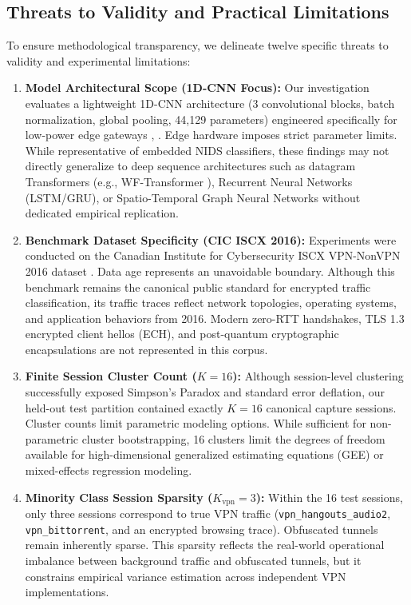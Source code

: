 \documentclass[conference]{IEEEtran}
\begin{document}
\subsection{Threats to Validity and Practical Limitations}
To ensure methodological transparency, we delineate twelve specific threats to validity and experimental limitations:
\begin{enumerate}
    \item \textbf{Model Architectural Scope (1D-CNN Focus):} Our investigation evaluates a lightweight 1D-CNN architecture (3 convolutional blocks, batch normalization, global pooling, 44,129 parameters) engineered specifically for low-power edge gateways \cite{b2}, \cite{b3}. Edge hardware imposes strict parameter limits. While representative of embedded NIDS classifiers, these findings may not directly generalize to deep sequence architectures such as datagram Transformers (e.g., WF-Transformer \cite{b30}), Recurrent Neural Networks (LSTM/GRU), or Spatio-Temporal Graph Neural Networks without dedicated empirical replication.
    \item \textbf{Benchmark Dataset Specificity (CIC ISCX 2016):} Experiments were conducted on the Canadian Institute for Cybersecurity ISCX VPN-NonVPN 2016 dataset \cite{b1}. Data age represents an unavoidable boundary. Although this benchmark remains the canonical public standard for encrypted traffic classification, its traffic traces reflect network topologies, operating systems, and application behaviors from 2016. Modern zero-RTT handshakes, TLS 1.3 encrypted client hellos (ECH), and post-quantum cryptographic encapsulations are not represented in this corpus.
    \item \textbf{Finite Session Cluster Count ($K = 16$):} Although session-level clustering successfully exposed Simpson's Paradox and standard error deflation, our held-out test partition contained exactly $K = 16$ canonical capture sessions. Cluster counts limit parametric modeling options. While sufficient for non-parametric cluster bootstrapping, 16 clusters limit the degrees of freedom available for high-dimensional generalized estimating equations (GEE) or mixed-effects regression modeling.
    \item \textbf{Minority Class Session Sparsity ($K_{\text{vpn}} = 3$):} Within the 16 test sessions, only three sessions correspond to true VPN traffic (\texttt{vpn\_hangouts\_audio2}, \texttt{vpn\_bittorrent}, and an encrypted browsing trace). Obfuscated tunnels remain inherently sparse. This sparsity reflects the real-world operational imbalance between background traffic and obfuscated tunnels, but it constrains empirical variance estimation across independent VPN implementations.

\end{enumerate}
\end{document}
